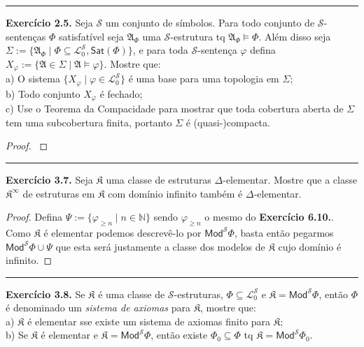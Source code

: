 \documentclass[11pt]{article}
\newcommand{\mc}[1]{\mathcal{#1}}
\newcommand{\mf}[1]{\mathfrak{#1}}
\newcommand{\msf}[1]{\mathsf{#1}}
\newcommand{\mbb}[1]{\mathbb{#1}}
\begin{document}
\hrule

\begin{shaded}
\textbf{Exercício 2.5.} Seja $\mc{S}$ um conjunto de símbolos. Para todo conjunto de $\mc{S}$-sentenças $\Phi$ satisfatível seja $\mf{A}_\Phi$ uma $\mc{S}$-estrutura tq $\mf{A}_\Phi\vDash\Phi$. Além disso seja $\Sigma:=\{\mf{A}_\Phi\mid\Phi\subseteq\mc{L}^\mc{S}_0,\msf{Sat}(\Phi)\}$, e para toda $\mc{S}$-sentença $\varphi$ defina $X_\varphi:=\{\mf{A}\in\Sigma\mid\mf{A}\vDash\varphi\}$. Mostre que:\\
a) O sistema $\{X_\varphi\mid\varphi\in\mc{L}^\mc{S}_0\}$ é uma base para uma topologia em $\Sigma$;\\
b) Todo conjunto $X_\varphi$ é fechado;\\
c) Use o Teorema da Compacidade para mostrar que toda cobertura aberta de $\Sigma$ tem uma subcobertura finita, portanto $\Sigma$ é (quasi-)compacta.
\end{shaded}

\begin{proof}
    \textbf{\color{red}{PENDENTE}}
\end{proof}

\hrule

\begin{shaded}
\textbf{Exercício 3.7.} Seja $\mf{K}$ uma classe de estruturas $\Delta$-elementar. Mostre que a classe $\mf{K}^\infty$ de estruturas em $\mf{K}$ com domínio infinito também é $\Delta$-elementar.
\end{shaded}

\begin{proof}
    Defina $\Psi:=\{\varphi_{\ge n}\mid n\in\mbb{N}\}$ sendo $\varphi_{\ge n}$ o mesmo do \textbf{Exercício 6.10.}. Como $\mf{K}$ é elementar podemos descrevê-lo por $\msf{Mod}^\mc{S}\Phi$, basta então pegarmos $\msf{Mod}^\mc{S}\Phi\cup\Psi$ que esta será justamente a classe dos modelos de $\mf{K}$ cujo domínio é infinito.
\end{proof}

\hrule

\begin{shaded}
\textbf{Exercício 3.8.} Se $\mf{K}$ é uma classe de $\mc{S}$-estruturas, $\Phi\subseteq\mc{L}^\mc{S}_0$ e $\mf{K}=\msf{Mod}^\mc{S}\Phi$, então $\Phi$ é denominado um \textit{sistema de axiomas} para $\mf{K}$, mostre que:\\
a) $\mf{K}$ é elementar sse existe um sistema de axiomas finito para $\mf{K}$;\\
b) Se $\mf{K}$ é elementar e $\mf{K}=\msf{Mod}^\mc{S}\Phi$, então existe $\Phi_0\subseteq\Phi$ tq $\mf{K}=\msf{Mod}^\mc{S}\Phi_0$.
\end{shaded}
\end{document}
